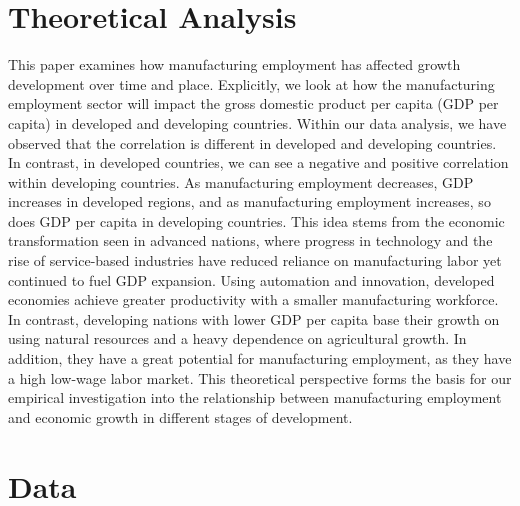 \documentclass[12pt]{article}
\begin{document}
\section{Theoretical Analysis}
\label{sec:theory}
This paper examines how manufacturing employment has affected growth development over time and place. Explicitly, we look at how the manufacturing employment sector will impact the gross domestic product per capita (GDP per capita) in developed and developing countries. Within our data analysis, we have observed that the correlation is different in developed and developing countries. In contrast, in developed countries, we can see a negative and positive correlation within developing countries. As manufacturing employment decreases, GDP increases in developed regions, and as manufacturing employment increases, so does GDP per capita in developing countries. This idea stems from the economic transformation seen in advanced nations, where progress in technology and the rise of service-based industries have reduced reliance on manufacturing labor yet continued to fuel GDP expansion. Using automation and innovation, developed economies achieve greater productivity with a smaller manufacturing workforce. In contrast, developing nations with lower GDP per capita base their growth on using natural resources and a heavy dependence on agricultural growth. In addition, they have a great potential for manufacturing employment, as they have a high low-wage labor market. This theoretical perspective forms the basis for our empirical investigation into the relationship between manufacturing employment and economic growth in different stages of development.


\section{Data}
\label{sec:data}
\end{document}

